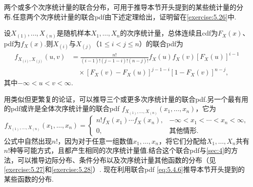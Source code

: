 两个或多个次序统计量的联合分布，可用于推导本节开头提到的某些统计量的分布.任意两个次序统计量的联合pdf由下述定理给出，证明留在\autoref{exercise:5.26}中.
\begin{theorem}\label{thm:5.4.6}
设$X_{(1)},\ldots,X_{(n)}$是随机样本$X_1,\ldots,X_n$的次序统计量，总体连续且cdf为$F_X(x)$、pdf为$f_X(x)$.则$X_{(i)}$与$X_{(j)}$（$1\le i<j\le n$）的联合pdf为
\begin{equation}\label{eq:5.4.6}
\begin{aligned}
f_{X_{(i)},X_{(j)}}(u,v)&=\frac{n!}{(i-1)!(j-1-i)!(n-j)!}f_X(u)f_X(v)[F_X(u)]^{i-1}\\
&\quad\times[F_X(v)-F_X(u)]^{j-1-i}[1-F_X(v)]^{n-j},
\end{aligned}
\end{equation}
其中$-\infty<u<v<\infty$.
\end{theorem}
用类似但更繁复的论证，可以推导三个或更多次序统计量的联合pdf.另一个最有用的pdf或许是全体次序统计量的联合pdf $f_{X_{(1)},\ldots,X_{(n)}}(x_1,\ldots,x_n)$，它为
$$f_{X_{(1)},\ldots,X_{(n)}}(x_1,\ldots,x_n)=\begin{cases}
n!f_X(x_1)\cdots f_X(x_n),&-\infty<x_1<\cdots<x_n<\infty,\\
0,&\text{其他情形}.
\end{cases}$$
公式中自然出现$n!$，因为对于任意一组数值$x_1,\ldots,x_n$，将它们分配给$X_1,\ldots,X_n$共有$n!$种等可能方式，且都产生相同的次序统计量值.结合这个联合pdf与\autoref{sec:4}的方法，可以推导边际分布、条件分布以及次序统计量其他函数的分布（见\autoref{exercise:5.27}和\autoref{exercise:5.28}\mbox{）.}
现在利用联合pdf \eqref{eq:5.4.6}推导本节开头提到的某些函数的分布.
